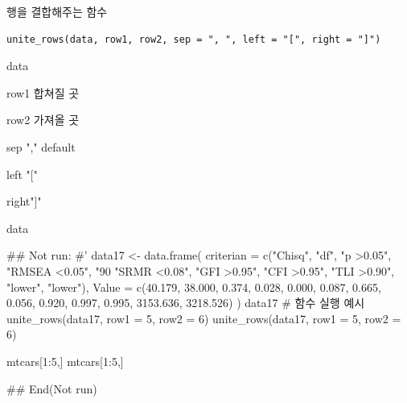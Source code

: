 \documentclass[a4paper]{book}
\begin{document}
%
\begin{Description}
행을 결합해주는 함수
\end{Description}
%
\begin{Usage}
\begin{verbatim}
unite_rows(data, row1, row2, sep = ", ", left = "[", right = "]")
\end{verbatim}
\end{Usage}
%
\begin{Arguments}
\begin{ldescription}
\item[\code{data}] data

\item[\code{row1}] row1 합쳐질 곳

\item[\code{row2}] row2 가져올 곳

\item[\code{sep}] sep "," default

\item[\code{left}] left "["

\item[\code{right}] right"]"
\end{ldescription}
\end{Arguments}
%
\begin{Value}
data
\end{Value}
%
\begin{Examples}
\begin{ExampleCode}

\#\# Not run: 
#'
data17 <- data.frame(
  criterian = c("Chisq", "df", "p >0.05", "RMSEA <0.05",
                "90%
                "SRMR <0.08", "GFI >0.95", "CFI >0.95", "TLI >0.90", "lower", "lower"),
  Value = c(40.179, 38.000, 0.374, 0.028, 0.000, 0.087,
            0.665, 0.056, 0.920, 0.997, 0.995, 3153.636, 3218.526)
)
data17
# 함수 실행 예시
unite_rows(data17, row1 = 5, row2 = 6)
unite_rows(data17, row1 = 5, row2 = 6)%

mtcars[1:5,]
mtcars[1:5,] %

## End(Not run)



\end{ExampleCode}
\end{Examples}
\end{document}
